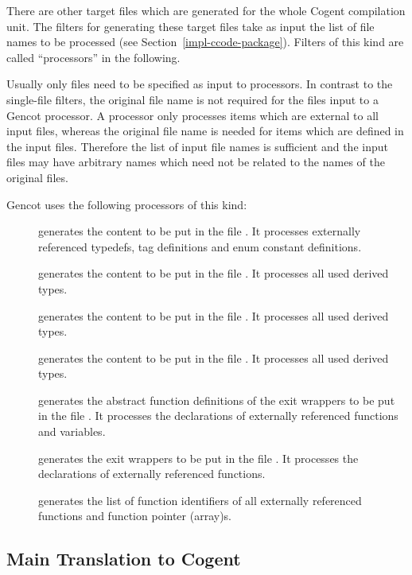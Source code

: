 There are other target files which are generated for the whole Cogent compilation unit. The filters for generating these target files 
take as input the list of file names to be processed (see Section~\ref{impl-ccode-package}). Filters of this kind 
are called ``processors'' in the following.

Usually only  files need to be specified as input to processors.
In contrast to the single-file filters, the original file name is not required for the files input to a 
Gencot processor. A processor only processes items which are external to all input files, whereas the original
file name is needed for items which are defined in the input files. Therefore the list of input file names is
sufficient and the input files may have arbitrary names which need not be related to the names of the original 
 files.

Gencot uses the following processors of this kind:
\begin{description}
\item[] generates the content to be put in the file . It 
processes externally referenced typedefs, tag definitions and enum constant definitions.
\item[] generates the content to be put in the file . It 
processes all used derived types.
\item[] generates the content to be put in the file . It 
processes all used derived types.
\item[] generates the content to be put in the file . It 
processes all used derived types.
\item[] generates the abstract function definitions of the exit wrappers to be put in the file 
. It processes the declarations of externally referenced functions and variables.
\item[] generates the exit wrappers to be put in the file . It processes
the declarations of externally referenced functions.
\item[] generates the list of function identifiers of all externally referenced functions and
function pointer (array)s.
\end{description}

\subsection{Main Translation to Cogent}
\label{impl-ccomps-main}

